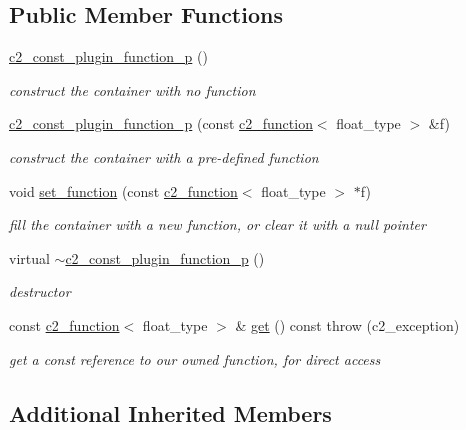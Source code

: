 \subsection*{Public Member Functions}
\begin{DoxyCompactItemize}
\item 
\hyperlink{classc2__const__plugin__function__p_a443dc7bcbdc6e458673b98aedf53ad56}{c2\+\_\+const\+\_\+plugin\+\_\+function\+\_\+p} ()
\begin{DoxyCompactList}\small\item\em construct the container with no function \end{DoxyCompactList}\item 
\hyperlink{classc2__const__plugin__function__p_a61e0b34f7740fc05a9290f25c0615214}{c2\+\_\+const\+\_\+plugin\+\_\+function\+\_\+p} (const \hyperlink{classc2__function}{c2\+\_\+function}$<$ float\+\_\+type $>$ \&f)
\begin{DoxyCompactList}\small\item\em construct the container with a pre-\/defined function \end{DoxyCompactList}\item 
void \hyperlink{classc2__const__plugin__function__p_ab77027bb14278d0f9e49f661f784fdb5}{set\+\_\+function} (const \hyperlink{classc2__function}{c2\+\_\+function}$<$ float\+\_\+type $>$ $\ast$f)
\begin{DoxyCompactList}\small\item\em fill the container with a new function, or clear it with a null pointer \end{DoxyCompactList}\item 
virtual \hyperlink{classc2__const__plugin__function__p_a9b26b8f7469d38ff816b9a3d9b137745}{$\sim$c2\+\_\+const\+\_\+plugin\+\_\+function\+\_\+p} ()
\begin{DoxyCompactList}\small\item\em destructor \end{DoxyCompactList}\item 
const \hyperlink{classc2__function}{c2\+\_\+function}$<$ float\+\_\+type $>$ \& \hyperlink{classc2__const__plugin__function__p_ad754d7ac308b8ae26a83c61ba2c26df2}{get} () const   throw (c2\+\_\+exception)
\begin{DoxyCompactList}\small\item\em get a const reference to our owned function, for direct access \end{DoxyCompactList}\end{DoxyCompactItemize}
\subsection*{Additional Inherited Members}



